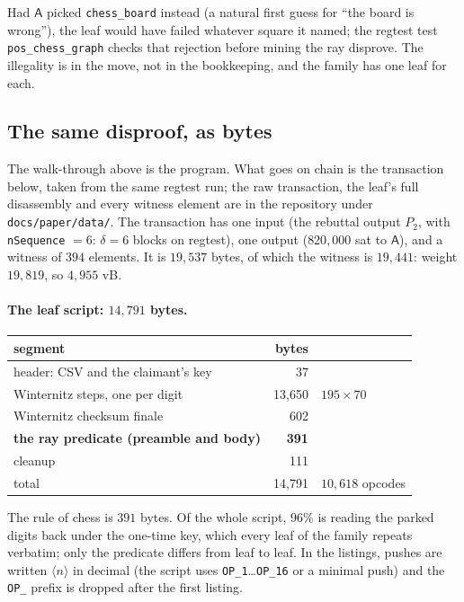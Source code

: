 \documentclass[11pt]{article}
\newcommand{\push}[1]{\ensuremath{\langle #1\rangle}}
\newcommand{\Pa}{\mathsf{A}}
\newcommand{\dl}{\delta}
\begin{document}
Had $\Pa$ picked \texttt{chess\_board} instead (a natural first guess
for ``the board is wrong''), the leaf would have failed whatever
square it named; the regtest test \texttt{pos\_chess\_graph} checks
that rejection before mining the ray disprove. The illegality is in the
move, not in the bookkeeping, and the family has one leaf for each.

\subsection{The same disproof, as bytes}
\label{app:chess:bytes}

The walk-through above is the program. What goes on chain is the
transaction below, taken from the same regtest run; the raw transaction,
the leaf's full disassembly and every witness element are in the
repository under \texttt{docs/paper/data/}. The transaction has one
input (the rebuttal output $P_2$, with \texttt{nSequence} $= 6$: $\dl = 6$
blocks on regtest), one output ($820{,}000$ sat to $\Pa$), and a witness
of $394$ elements. It is $19{,}537$ bytes, of which the witness is
$19{,}441$: weight $19{,}819$, so $4{,}955$ vB.

\paragraph{The leaf script: $14{,}791$ bytes.}
\begin{center}
\begin{tabular}{@{}lrl@{}}
\toprule
segment & bytes & \\
\midrule
header: CSV and the claimant's key & 37 & \\
Winternitz steps, one per digit & 13{,}650 & $195 \times 70$ \\
Winternitz checksum finale & 602 & \\
\textbf{the ray predicate (preamble and body)} & \textbf{391} & \\
cleanup & 111 & \\
\midrule
total & 14{,}791 & $10{,}618$ opcodes \\
\bottomrule
\end{tabular}
\end{center}
The rule of chess is $391$ bytes. Of the whole script, $96\%$ is
reading the parked digits back under the one-time key, which every
leaf of the family repeats verbatim; only the predicate differs from
leaf to leaf. In the listings, pushes are written \push{n} in decimal
(the script uses \texttt{OP\_1}\dots\texttt{OP\_16} or a minimal push)
and the \texttt{OP\_} prefix is dropped after the first listing.
\end{document}
